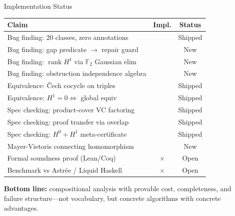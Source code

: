 \documentclass[aspectratio=169,10pt]{beamer}
\newcommand{\yes}{\textcolor{good}{\checkmark}}
\newcommand{\no}{\textcolor{meh}{$\times$}}
\begin{document}
\begin{frame}{Implementation Status}
\renewcommand{\arraystretch}{1.15}
\footnotesize
\begin{tabular}{@{}p{6.2cm}cc@{}}
\toprule
\textbf{Claim} & \textbf{Impl.} & \textbf{Status} \\
\midrule
Bug finding: 20 classes, zero annotations & \yes & Shipped \\
Bug finding: gap predicate $\to$ repair guard & \yes & \textcolor{good}{New} \\
Bug finding: $\operatorname{rank} H^1$ via $\mathbb{F}_2$ Gaussian elim & \yes & \textcolor{good}{New} \\
Bug finding: obstruction independence algebra & \yes & \textcolor{good}{New} \\
Equivalence: \v{C}ech cocycle on triples & \yes & Shipped \\
Equivalence: $H^1\!=\!0 \Leftrightarrow$ global equiv & \yes & Shipped \\
Spec checking: product-cover VC factoring & \yes & Shipped \\
Spec checking: proof transfer via overlap & \yes & Shipped \\
Spec checking: $H^0 + H^1$ meta-certificate & \yes & Shipped \\
Mayer-Vietoris connecting homomorphism & \yes & \textcolor{good}{New} \\
\midrule
Formal soundness proof (Lean/Coq) & \no & Open \\
Benchmark vs Astr\'ee / Liquid Haskell & \no & Open \\
\bottomrule
\end{tabular}

\vspace{0.4em}
\textbf{Bottom line:} compositional analysis with provable cost,
completeness, and failure structure---not vocabulary,
but concrete algorithms with concrete advantages.
\end{frame}
\end{document}
